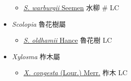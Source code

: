 \begin{itemize}
\begin{itemize}
        \item[] \href{http://www.theplantlist.org/tpl1.1/search?q=Salix+warburgii}{\textit{S. warburgii} Seemen}   水柳  \# LC
  \end{itemize}
 \item[] \textit{Scolopia} 魯花樹屬
                                
  \begin{itemize}
        \item[] \href{http://www.theplantlist.org/tpl1.1/search?q=Scolopia+oldhamii}{\textit{S. oldhamii} Hance}   魯花樹   LC
  \end{itemize}
 \item[] \textit{Xylosma} 柞木屬
                                
  \begin{itemize}
        \item[] \href{http://www.theplantlist.org/tpl1.1/search?q=Xylosma+congesta}{\textit{X. congesta} (Lour.) Merr.}   柞木   LC
  \end{itemize}
  \end{itemize}
